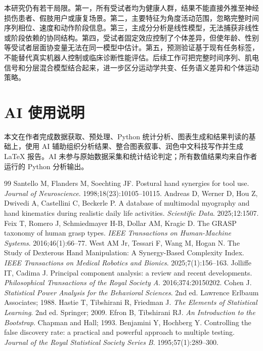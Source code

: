 \documentclass[10pt,a4paper]{ctexart}
\begin{document}
本研究仍有若干局限。第一，所有受试者均为健康人群，结果不能直接外推至神经损伤患者、假肢用户或康复场景。第二，主要特征为角度活动范围，忽略完整时间序列相位、速度和动作阶段信息。第三，主成分分析是线性模型，无法捕获非线性或阶段依赖的协同结构。第四，受试者固定效应控制了个体差异，但使年龄、性别等受试者层面协变量无法在同一模型中估计。第五，预测验证基于现有任务标签，不能替代真实机器人控制或临床诊断性能评估。后续工作可把完整时间序列、肌电信号和分层混合模型结合起来，进一步区分运动学共变、任务语义差异和个体运动策略。

\section{AI 使用说明}
本文在作者完成数据获取、预处理、Python 统计分析、图表生成和结果判读的基础上，使用 AI 辅助组织分析结果、整合图表叙事、润色中文科技写作并生成 LaTeX 报告。AI 未参与原始数据采集和统计结论判定；所有数值结果均来自作者运行的 Python 分析输出。

\begin{thebibliography}{99}
 Santello M, Flanders M, Soechting JF. Postural hand synergies for tool use. \textit{Journal of Neuroscience}. 1998;18(23):10105--10115.
 Andreas D, Werner D, Hou Z, Dwivedi A, Castellini C, Beckerle P. A database of multimodal myography and hand kinematics during realistic daily life activities. \textit{Scientific Data}. 2025;12:1507.
 Feix T, Romero J, Schmiedmayer H-B, Dollar AM, Kragic D. The GRASP taxonomy of human grasp types. \textit{IEEE Transactions on Human-Machine Systems}. 2016;46(1):66--77.
 West AM Jr, Tessari F, Wang M, Hogan N. The Study of Dexterous Hand Manipulation: A Synergy-Based Complexity Index. \textit{IEEE Transactions on Medical Robotics and Bionics}. 2025;7(1):156--163.
 Jolliffe IT, Cadima J. Principal component analysis: a review and recent developments. \textit{Philosophical Transactions of the Royal Society A}. 2016;374:20150202.
 Cohen J. \textit{Statistical Power Analysis for the Behavioral Sciences}. 2nd ed. Lawrence Erlbaum Associates; 1988.
 Hastie T, Tibshirani R, Friedman J. \textit{The Elements of Statistical Learning}. 2nd ed. Springer; 2009.
 Efron B, Tibshirani RJ. \textit{An Introduction to the Bootstrap}. Chapman and Hall; 1993.
 Benjamini Y, Hochberg Y. Controlling the false discovery rate: a practical and powerful approach to multiple testing. \textit{Journal of the Royal Statistical Society Series B}. 1995;57(1):289--300.
\end{thebibliography}
\end{document}
